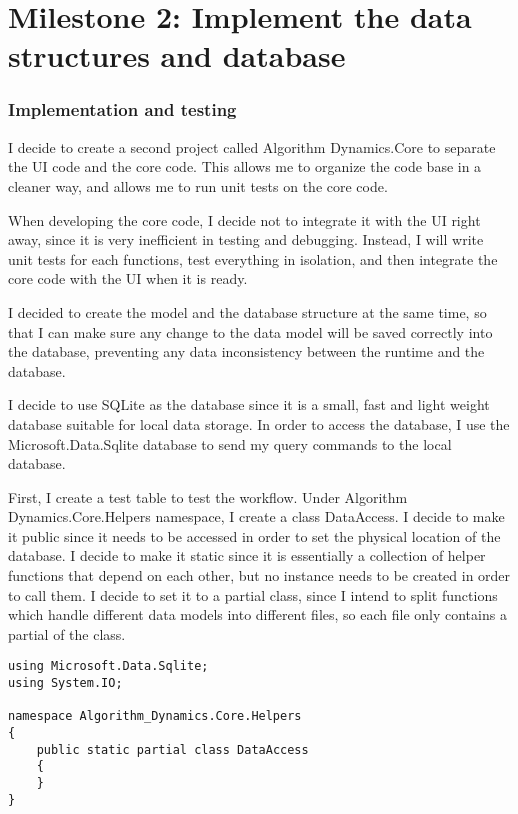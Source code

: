 \documentclass[report.tex]{subfiles}
\begin{document}
\section{Milestone 2: Implement the data structures and database}

\subsubsection{Implementation and testing}

I decide to create a second project called Algorithm Dynamics.Core to separate the UI code and the core code. This allows me to organize the code base in a cleaner way, and allows me to run unit tests on the core code.

When developing the core code, I decide not to integrate it with the UI right away, since it is very inefficient in testing and debugging. Instead, I will write unit tests for each functions, test everything in isolation, and then integrate the core code with the UI when it is ready.

I decided to create the model and the database structure at the same time, so that I can make sure any change to the data model will be saved correctly into the database, preventing any data inconsistency between the runtime and the database.

I decide to use SQLite\cite{sqlite} as the database since it is a small, fast and light weight database suitable for local data storage. In order to access the database, I use the Microsoft.Data.Sqlite\cite{microsoft:docs:sqlite} database to send my query commands to the local database.

First, I create a test table to test the workflow. Under Algorithm Dynamics.Core.Helpers namespace, I create a class DataAccess. I decide to make it public since it needs to be accessed in order to set the physical location of the database. I decide to make it static since it is essentially a collection of helper functions that depend on each other, but no instance needs to be created in order to call them. I decide to set it to a partial class, since I intend to split functions which handle different data models into different files, so each file only contains a partial of the class.

\begin{verbatim}
using Microsoft.Data.Sqlite;
using System.IO;

namespace Algorithm_Dynamics.Core.Helpers
{
    public static partial class DataAccess
    {
    }
}
\end{verbatim}
\end{document}
